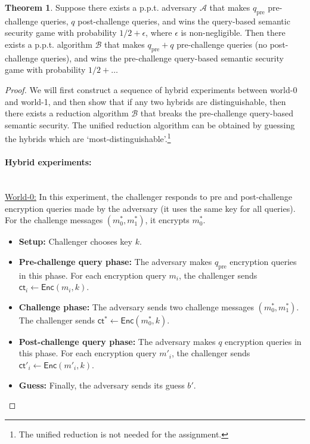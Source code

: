 \documentclass[10pt,addpoints]{exam}
\newcommand{\calA}{\mathcal{A}}
\newcommand{\calB}{\mathcal{B}}
\newcommand{\enc}{\mathsf{Enc}}
\newcommand{\qpre}{q_{\mathrm{pre}}}
\newcommand{\ct}{\mathsf{ct}}
\theoremstyle{definition}
\newtheorem{theorem}{Theorem}[section]
\begin{document}
        \color{black}


        \begin{theorem}
            Suppose there exists a p.p.t. adversary $\calA$ that makes $\qpre$ pre-challenge queries, $q$ post-challenge queries, and wins the query-based semantic security game with probability $1/2 + \epsilon$, where $\epsilon$ is non-negligible. Then there exists a p.p.t. algorithm $\calB$ that makes $\qpre + q$ pre-challenge queries (no post-challenge queries), and wins the pre-challenge query-based semantic security game with probability $1/2 + \ldots$ 
        \end{theorem}


        \begin{proof}

        We will first construct a sequence of hybrid experiments between world-0 and world-1, and then show that if any two hybrids are distinguishable, then there exists a reduction algorithm $\calB$ that breaks the pre-challenge query-based semantic security. The unified reduction algorithm can be obtained by guessing the hybrids which are `most-distinguishable'.\footnote{The unified reduction is not needed for the assignment.}

        \vspace{10pt}

        \paragraph{Hybrid experiments:\\ \\} 

        \underline{World-0:} In this experiment, the challenger responds to pre and post-challenge encryption queries made by the adversary (it uses the same key for all queries). For the challenge messages $(m^*_0, m^*_1)$, it encrypts $m^*_0$. 

        \begin{itemize}[noitemsep]
            \item \textbf{Setup:} Challenger chooses key $k$.
            \item \textbf{Pre-challenge query phase:} The adversary makes $\qpre$ encryption queries in this phase. For each encryption query $m_i$, the challenger sends $\ct_i \gets \enc(m_i, k)$.
            \item \textbf{Challenge phase:} The adversary sends two challenge messages $(m^*_0, m^*_1)$. The challenger sends $\ct^* \gets \enc(m^*_0, k)$. 
            \item \textbf{Post-challenge query phase:} The adversary makes $q$ encryption queries in this phase. For each encryption query $m'_i$, the challenger sends $\ct'_i \gets \enc(m'_i, k)$.
            \item \textbf{Guess:} Finally, the adversary sends its guess $b'$.
        \end{itemize}



\end{proof}
\end{document}
